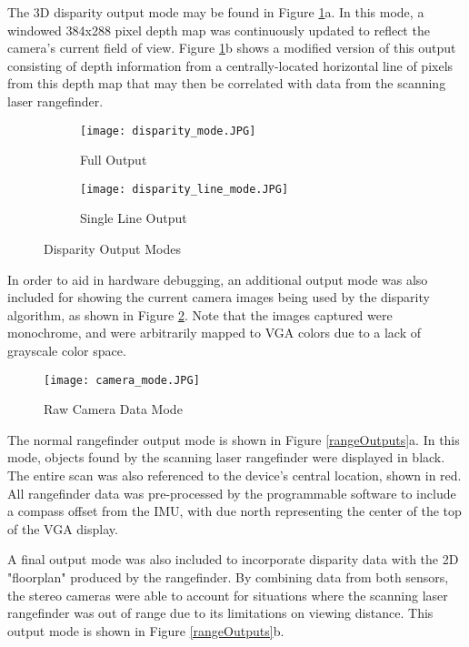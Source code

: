 \par
The 3D disparity output mode may be found in Figure \ref{disparityOutputs}a. In this mode, a windowed 384x288 pixel depth map was continuously updated to reflect the camera's current field of view. Figure \ref{disparityOutputs}b shows a modified version of this output consisting of depth information from a centrally-located horizontal line of pixels from this depth map that may then be correlated with data from the scanning laser rangefinder. 
\par
\begin{figure}[H] 
         \begin{subfigure}[h]{0.5\textwidth}
              \centerline{\texttt{[image: disparity\_mode.JPG]}}
             \caption{Full Output}
         \end{subfigure}
         \begin{subfigure}[h]{0.5\textwidth}
             \centerline{\texttt{[image: disparity\_line\_mode.JPG]}}
             \caption{Single Line Output}
         \end{subfigure}
\caption{Disparity Output Modes}
\label{disparityOutputs}
\end{figure}
\par
In order to aid in hardware debugging, an additional output mode was also included for showing the current camera images being used by the disparity algorithm, as shown in Figure \ref{camOutMode}. Note that the images captured were monochrome, and were arbitrarily mapped to VGA colors due to a lack of grayscale color space.
\par
\begin{figure}[H]  
 	\centerline{
	\texttt{[image: camera\_mode.JPG]}
	}
	\caption{Raw Camera Data Mode}
	\label{camOutMode}
\end{figure} 
\par
The normal rangefinder output mode is shown in Figure \ref{rangeOutputs}a. In this mode, objects found by the scanning laser rangefinder were displayed in black. The entire scan was also referenced to the device's central location, shown in red. All rangefinder data was pre-processed by the programmable software to include a compass offset from the IMU, with due north representing the center of the top of the VGA display.
\par 
A final output mode was also included to incorporate disparity data with the 2D "floorplan" produced by the rangefinder. By combining data from both sensors, the stereo cameras were able to account for situations where the scanning laser rangefinder was out of range due to its limitations on viewing distance. This output mode is shown in Figure \ref{rangeOutputs}b.

